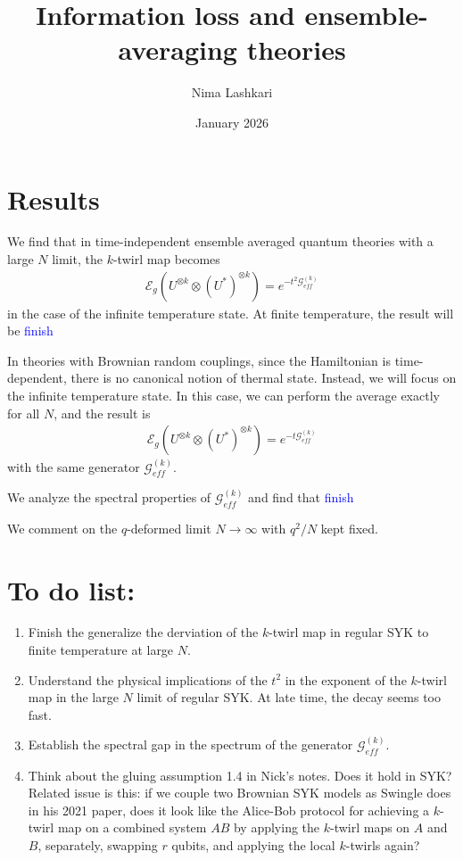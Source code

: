 \documentclass{article}
\title{Information loss and ensemble-averaging theories}
\author{Nima Lashkari}
\date{January 2026}
\theoremstyle{definition}
\newcommand{\lb}{\left(}
\newcommand{\rb}{\right)}
\newcommand{\NL}[1]{\textcolor{blue}{#1}}
\begin{document}
    \maketitle

    \section{Results}



    We find that in time-independent ensemble averaged quantum theories with a large
    $N$ limit, the $k$-twirl map becomes
    \begin{eqnarray}
        \mathcal{E}_g\lb U^{\otimes k}\otimes (U^*)^{\otimes k} \rb=e^{-t^2\mathcal{G}_{eff}^{(k)}}
    \end{eqnarray}
    in the case of the infinite temperature state. At finite temperature, the
    result will be \NL{finish}

    In theories with Brownian random couplings, since the Hamiltonian is time-dependent,
    there is no canonical notion of thermal state. Instead, we will focus on the
    infinite temperature state. In this case, we can perform the average exactly
    for all $N$, and the result is
    \begin{eqnarray}
        \mathcal{E}_g\lb U^{\otimes k}\otimes (U^*)^{\otimes k} \rb=e^{-t\mathcal{G}_{eff}^{(k)}}
    \end{eqnarray}
    with the same generator $\mathcal{G}_{eff}^{(k)}$.

    We analyze the spectral properties of $\mathcal{G}_{eff}^{(k)}$ and find that
    \NL{finish}

    We comment on the $q$-deformed limit $N\to \infty$ with $q^{2}/N$ kept fixed.

    \section{To do list:}
    \begin{enumerate}
        \item Finish the generalize the derviation of the $k$-twirl map in regular
            SYK to finite temperature at large $N$.

        \item Understand the physical implications of the $t^{2}$ in the exponent
            of the $k$-twirl map in the large $N$ limit of regular SYK. At late
            time, the decay seems too fast.

        \item Establish the spectral gap in the spectrum of the generator $\mathcal{G}
            _{eff}^{(k)}$.

        \item Think about the gluing assumption 1.4 in Nick's notes. Does it
            hold in SYK? Related issue is this: if we couple two Brownian SYK
            models as Swingle does in his 2021 paper, does it look like the Alice-Bob
            protocol for achieving a $k$-twirl map on a combined system $AB$ by applying
            the $k$-twirl maps on $A$ and $B$, separately, swapping $r$ qubits,
            and applying the local $k$-twirls again?
    \end{enumerate}
\end{document}
